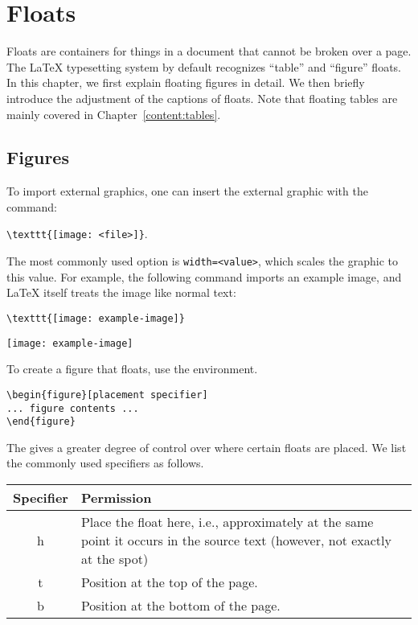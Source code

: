 \chapter{Floats}
\label{content:floats}

Floats are containers for things in a document that cannot be broken over a page. The \LaTeX{} typesetting system by default recognizes ``table'' and ``figure'' floats. In this chapter, we first explain floating figures in detail. We then briefly introduce the adjustment of the captions of floats. Note that floating tables are mainly covered in Chapter~\ref{content:tables}.

\section{Figures}
\label{content:floats:figures}

To import external graphics, one can insert the external graphic with the command:

\begin{center}
    \verb|\texttt{[image: <file>]}|.
\end{center}

The most commonly used option is \verb|width=<value>|, which scales the graphic to this value. For example, the following command imports an example image, and \LaTeX{} itself treats the image like normal text:

\begin{center}
    \verb|\texttt{[image: example-image]}|
    \bigskip
    
    \texttt{[image: example-image]}
\end{center}

To create a figure that floats, use the  environment.

\bigskip

\begin{lstlisting}
\begin{figure}[placement specifier]
... figure contents ...
\end{figure}
\end{lstlisting}

The  gives a greater degree of control over where certain floats are placed. We list the commonly used specifiers as follows.

\bigskip

\begin{tabularx}{.9\linewidth}{cX}
    \toprule
    Specifier & Permission \\
    \midrule
    h & Place the float here, i.e., approximately at the same point it occurs in the source text (however, not exactly at the spot) \\
    t & Position at the top of the page. \\
    b & Position at the bottom of the page. \\
    \bottomrule
\end{tabularx}

